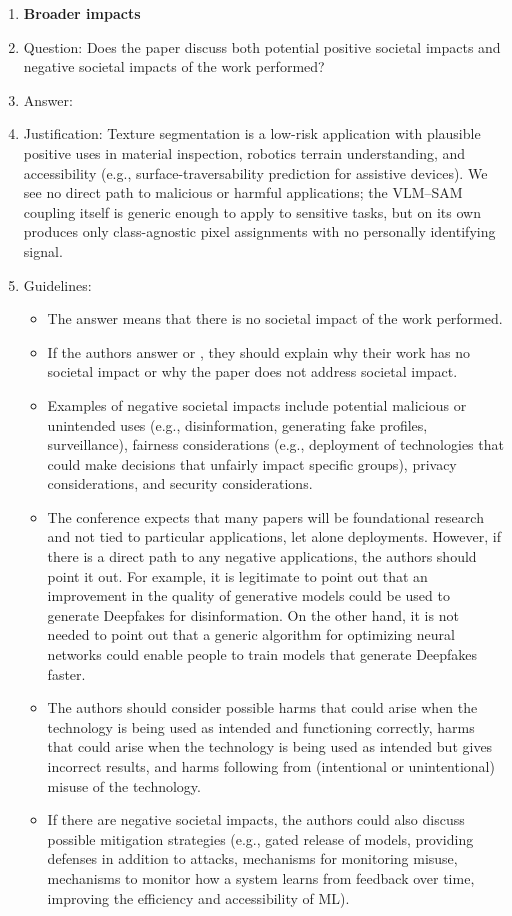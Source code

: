 \begin{enumerate}
\item {\bf Broader impacts}
    \item[] Question: Does the paper discuss both potential positive societal impacts and negative societal impacts of the work performed?
    \item[] Answer: \answerYes{}
    \item[] Justification: Texture segmentation is a low-risk application with plausible positive uses in material inspection, robotics terrain understanding, and accessibility (e.g., surface-traversability prediction for assistive devices). We see no direct path to malicious or harmful applications; the VLM--SAM coupling itself is generic enough to apply to sensitive tasks, but on its own produces only class-agnostic pixel assignments with no personally identifying signal.
    \item[] Guidelines:
    \begin{itemize}
        \item The answer \answerNA{} means that there is no societal impact of the work performed.
        \item If the authors answer \answerNA{} or \answerNo, they should explain why their work has no societal impact or why the paper does not address societal impact.
        \item Examples of negative societal impacts include potential malicious or unintended uses (e.g., disinformation, generating fake profiles, surveillance), fairness considerations (e.g., deployment of technologies that could make decisions that unfairly impact specific groups), privacy considerations, and security considerations.
        \item The conference expects that many papers will be foundational research and not tied to particular applications, let alone deployments. However, if there is a direct path to any negative applications, the authors should point it out. For example, it is legitimate to point out that an improvement in the quality of generative models could be used to generate Deepfakes for disinformation. On the other hand, it is not needed to point out that a generic algorithm for optimizing neural networks could enable people to train models that generate Deepfakes faster.
        \item The authors should consider possible harms that could arise when the technology is being used as intended and functioning correctly, harms that could arise when the technology is being used as intended but gives incorrect results, and harms following from (intentional or unintentional) misuse of the technology.
        \item If there are negative societal impacts, the authors could also discuss possible mitigation strategies (e.g., gated release of models, providing defenses in addition to attacks, mechanisms for monitoring misuse, mechanisms to monitor how a system learns from feedback over time, improving the efficiency and accessibility of ML).
    \end{itemize}


\end{enumerate}
